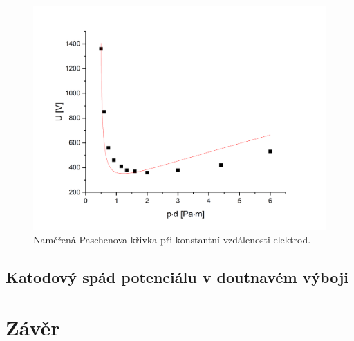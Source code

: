 \documentclass[a4paper,12pt]{article}
\begin{document}
\begin{figure}[h]
	\centering
	\includegraphics[width=130mm]{dfixed.png}
	\caption{Naměřená Paschenova křivka při konstantní vzdálenosti elektrod.}
	\label{dfixed}
\end{figure}

\subsection{Katodový spád potenciálu v doutnavém výboji}


\section{Závěr}
\end{document}
